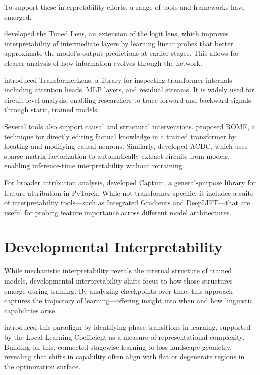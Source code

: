 To support these interpretability efforts, a range of tools and frameworks have emerged.

\citet{belrose2023eliciting} developed the Tuned Lens, an extension of the logit lens, which improves interpretability of intermediate layers by learning linear probes that better approximate the model's output predictions at earlier stages. This allows for clearer analysis of how information evolves through the network.

\citet{nanda2022transformerlens} introduced TransformerLens, a library for inspecting transformer internals—including attention heads, MLP layers, and residual streams. It is widely used for circuit-level analysis, enabling researchers to trace forward and backward signals through static, trained models.

Several tools also support causal and structural interventions. \citet{meng2022locating} proposed ROME, a technique for directly editing factual knowledge in a trained transformer by locating and modifying causal neurons. Similarly, \citet{conmy2023towards} developed ACDC, which uses sparse matrix factorization to automatically extract circuits from models, enabling inference-time interpretability without retraining.

For broader attribution analysis, \citet{kokhlikyan2020captum} developed Captum, a general-purpose library for feature attribution in PyTorch. While not transformer-specific, it includes a suite of interpretability tools—such as Integrated Gradients and DeepLIFT—that are useful for probing feature importance across different model architectures.



\section{Developmental Interpretability}
While mechanistic interpretability reveals the internal structure of trained models, developmental interpretability shifts focus to how those structures emerge during training. By analyzing checkpoints over time, this approach captures the trajectory of learning—offering insight into when and how linguistic capabilities arise.

\citet{hoogland2023towards} introduced this paradigm by identifying phase transitions in learning, supported by the Local Learning Coefficient as a measure of representational complexity. Building on this, \citet{hoogland2025losslandscape} connected stagewise learning to loss landscape geometry, revealing that shifts in capability often align with flat or degenerate regions in the optimization surface.

